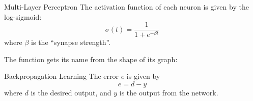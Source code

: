 \documentclass[bigger]{beamer}
\begin{document}
\begin{frame}{Multi-Layer Perceptron}
The activation function of each neuron is given by the log-{}sigmoid:
\begin{equation*}\sigma(t) = \frac{1}{1 + e^{-\beta t}}\end{equation*}
where $\beta$ is the ``synapse strength''.

The function gets its name from the shape of its graph:


\end{frame}

\begin{frame}{Backpropagation Learning}
The error $e$ is given by
\begin{equation*}e = d - y\end{equation*}
where $d$ is the desired output, and $y$ is the output from the network.

\end{frame}
\end{document}
